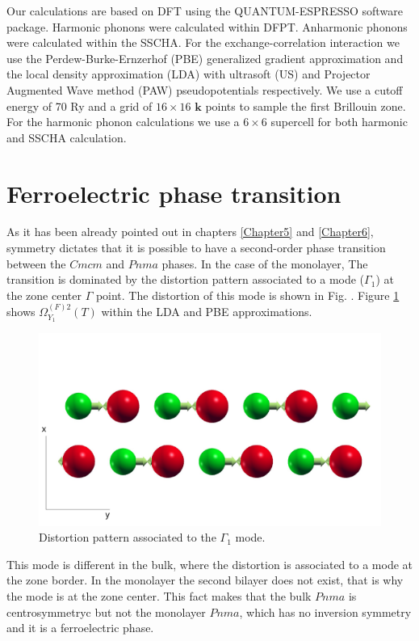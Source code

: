 Our calculations are based on DFT using the QUANTUM-ESPRESSO\cite{giannozzi2009quantum} software package. Harmonic 
phonons were calculated within DFPT. Anharmonic phonons were calculated within the SSCHA. For the 
exchange-correlation interaction we use the Perdew-Burke-Ernzerhof (PBE) generalized gradient approximation and the 
local density approximation (LDA) with ultrasoft (US) and Projector Augmented Wave method (PAW) pseudopotentials 
respectively. We use a cutoff energy of 70 Ry and a grid of $16\times16$  $\boldsymbol{k}$ points to sample the first 
Brillouin zone. For the harmonic phonon calculations we use a $6\times6$ supercell for both harmonic and SSCHA 
calculation.

\section{Ferroelectric phase transition}

As it has been already pointed out in chapters \ref{Chapter5} and \ref{Chapter6}, 
symmetry\cite{orobengoa2009amplimodes,perez2010mode} dictates that it is possible to have a second-order phase 
transition between the $Cmcm$ and $Pnma$ phases. In the case of the monolayer, The transition is dominated by the 
distortion pattern associated to a mode ($\Gamma_{1}$) at the zone center $\Gamma$ point. The distortion of this 
mode is shown in Fig. . 
Figure \ref{transition-mono} shows $\Omega^{(F)2}_{Y_{1}}(T)$ within the LDA and PBE approximations.
\begin{figure}[h]
\includegraphics[width=\linewidth]{Figures/transition-mono.pdf}
	\caption{Distortion pattern associated to the $\Gamma_{1}$ mode.}
\label{transition-mono}
\end{figure}
This mode is different in the bulk, where the distortion is associated to a mode at the 
zone border. In the monolayer the second bilayer does not exist, that is why the mode is at the zone center. This 
fact makes that the bulk $Pnma$ is centrosymmetryc but not the monolayer $Pnma$, which has no inversion symmetry 
and it is a ferroelectric phase. \\

